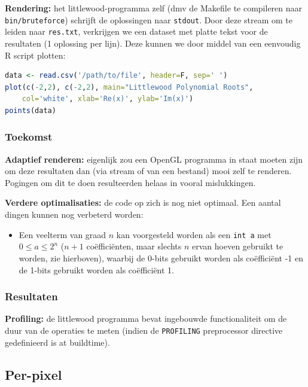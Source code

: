 \documentclass{article}
\begin{document}
\textbf{Rendering:} het littlewood-programma zelf (dmv de Makefile te compileren naar \verb|bin/bruteforce|) schrijft de oplossingen naar \verb|stdout|. Door deze stream om te leiden naar \verb|res.txt|, verkrijgen we een dataset met platte tekst voor de resultaten (1 oplossing per lijn). Deze kunnen we door middel van een eenvoudig R script plotten:
\begin{lstlisting}[language=R]
data <- read.csv('/path/to/file', header=F, sep=' ')
plot(c(-2,2), c(-2,2), main="Littlewood Polynomial Roots",
	col='white', xlab='Re(x)', ylab='Im(x)')
points(data)
\end{lstlisting}

\subsubsection{Toekomst}
\textbf{Adaptief renderen:} eigenlijk zou een OpenGL programma in staat moeten zijn om deze resultaten dan (via stream of van een bestand) mooi zelf te renderen. Pogingen om dit te doen resulteerden helaas in vooral mislukkingen.

\textbf{Verdere optimalisaties:} de code op zich is nog niet optimaal. Een aantal dingen kunnen nog verbeterd worden:\
\begin{itemize}
 \item Een veelterm van graad $n$ kan voorgesteld worden als een \verb|int a|  met $0 \leq a \leq 2^{n}$ ($n+1$ co\"effici\"enten, maar slechts $n$ ervan hoeven gebruikt te worden, zie hierboven), waarbij de 0-bits gebruikt worden als co\"effici\"ent -1 en de 1-bits gebruikt worden als co\"effici\"ent 1.
\end{itemize}

\subsubsection{Resultaten}
\textbf{Profiling:} de littlewood programma bevat ingebouwde functionaliteit om de duur van de operaties te meten (indien de \verb|PROFILING| preprocessor directive gedefinieerd is at buildtime).

\subsection{Per-pixel}
\end{document}
